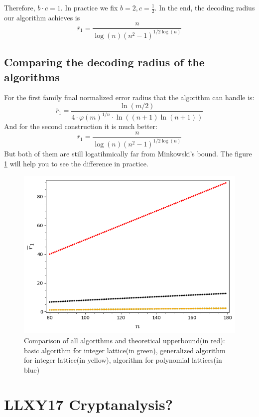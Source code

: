 \documentclass[12pt]{article}
\begin{document}
Therefore, $b \cdot c = 1$. In practice we fix $b = 2, c = \frac{1}{2}$. In the end, the decoding radius our algorithm achieves is
\[
    \bar{r}_1 = \frac{n}{\log(n)(n^{2} - 1)^{1/2\log(n)}}
\]

\subsection{Comparing the decoding radius of the algorithms}
\label{sec:comparison}

For the first family final normalized error radius that the algorithm can handle is:
\[
    \bar{r}_1 = \frac{\ln(m/2)}{4 \cdot \varphi(m)^{1/n} \cdot \ln((n+1)\ln(n+1))}
\]
And for the second construction it is much better:
\[
    \bar{r}_1 = \frac{n}{\log(n)(n^{2} - 1)^{1/2\log(n)}}
\]
But both of them are still logatihmically far from Minkowski's bound. The figure \ref{fig:everything} will help you to see the difference in practice.

\begin{figure}
  \includegraphics[width=\linewidth]{everything.png}
  \caption{Comparison of all algorithms and theoretical upperbound(in red): basic algorithm for integer lattice(in green), generalized algorithm for integer lattice(in yellow), algorithm for polynomial lattices(in blue)}
  \label{fig:everything}
\end{figure}

\section{LLXY17 Cryptanalysis?}
\label{sec:cryptanalysis}
\end{document}
